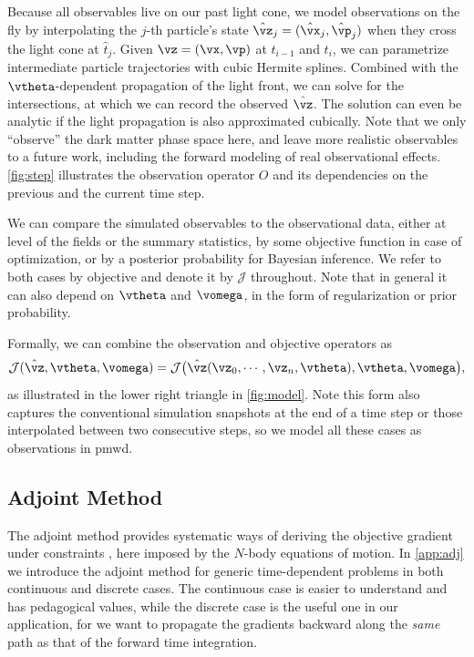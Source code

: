 \documentclass[modern, trackchanges, dvipsnames]{aastex631}
\newcommand{\pmwd}{{\usefont{T1}{nova}{m}{sl}pmwd}}
\newcommand{\cJ}{\mathcal{J}}
\begin{document}
Because all observables live on our past light cone, we model
observations on the fly by interpolating the $j$-th particle's state
$\hat\vz_j = (\hat\vx_j, \hat\vp_j)$ when they cross the light cone at
$\hat t_j$.
Given $\vz = (\vx, \vp)$ at $t_{i-1}$ and $t_i$, we can parametrize
intermediate particle trajectories with cubic Hermite splines.
Combined with the $\vtheta$-dependent propagation of the light front, we
can solve for the intersections, at which we can record the observed
$\hat\vz$.
The solution can even be analytic if the light propagation is also
approximated cubically.
Note that we only ``observe'' the dark matter phase space here, and
leave more realistic observables to a future work, including the forward
modeling of real observational effects.
\autoref{fig:step} illustrates the observation operator $O$ and its
dependencies on the previous and the current time step.

We can compare the simulated observables to the observational data,
either at level of the fields or the summary statistics, by some
objective function in case of optimization, or by a posterior
probability for Bayesian inference.
We refer to both cases by objective and denote it by $\cJ$ throughout.
Note that in general it can also depend on $\vtheta$ and $\vomega$, in
the form of regularization or prior probability.

Formally, we can combine the observation and objective operators as
%
\begin{equation}
\cJ(\hat\vz, \vtheta, \vomega)
  = \cJ \bigl(
    \hat\vz(\vz_0, \cdots, \vz_n, \vtheta), \vtheta, \vomega
  \bigr),
\label{O}
\end{equation}
%
as illustrated in the lower right triangle in \autoref{fig:model}.
Note this form also captures the conventional simulation snapshots at
the end of a time step or those interpolated between two consecutive
steps, so we model all these cases as observations in \pmwd.


\vspace{1em}
\subsection{Adjoint Method}
\label{sec:adj}

The adjoint method provides systematic ways of deriving the objective
gradient under constraints \citep{Pontryagin1962}, here imposed by the
$N$-body equations of motion.
In \autoref{app:adj} we introduce the adjoint method for generic
time-dependent problems in both continuous and discrete cases.
The continuous case is easier to understand and has pedagogical values,
while the discrete case is the useful one in our application, for we
want to propagate the gradients backward along the \emph{same} path as
that of the forward time integration.
\end{document}
